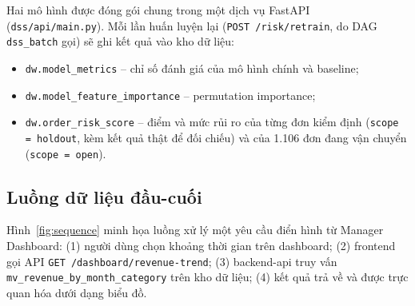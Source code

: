 \hspace{1cm}
Hai mô hình được đóng gói chung trong một dịch vụ FastAPI (\texttt{dss/api/main.py}). Mỗi lần
huấn luyện lại (\texttt{POST /risk/retrain}, do DAG \texttt{dss\_batch} gọi) sẽ ghi kết quả vào
kho dữ liệu:
\begin{itemize}
    \item \texttt{dw.model\_metrics} -- chỉ số đánh giá của mô hình chính và baseline;
    \item \texttt{dw.model\_feature\_importance} -- permutation importance;
    \item \texttt{dw.order\_risk\_score} -- điểm và mức rủi ro của từng đơn kiểm định
          (\texttt{scope = holdout}, kèm kết quả thật để đối chiếu) và của 1.106 đơn đang vận
          chuyển (\texttt{scope = open}).
\end{itemize}

\subsection{Luồng dữ liệu đầu-cuối}
\hspace{1cm}
Hình~\ref{fig:sequence} minh họa luồng xử lý một yêu cầu điển hình từ Manager Dashboard: (1)
người dùng chọn khoảng thời gian trên dashboard; (2) frontend gọi API
\texttt{GET /dashboard/\allowbreak revenue-trend}; (3) backend-api truy vấn \texttt{mv\_revenue\_by\_month\_category}
trên kho dữ liệu; (4) kết quả trả về và được trực quan hóa dưới dạng biểu đồ.

